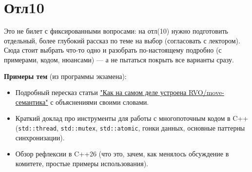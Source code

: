
\section{Отл10}

Это не билет с фиксированными вопросами: на отл(10) нужно подготовить отдельный, более глубокий рассказ по теме на выбор (согласовать с лектором). Сюда стоит выбрать что-то одно и разобрать по-настоящему подробно (с примерами, кодом, нюансами) — а не пытаться покрыть все варианты сразу.

\textbf{Примеры тем} (из программы экзамена):
\begin{itemize}
  \item Подробный пересказ статьи \href{https://habr.com/ru/articles/344206/}{"Как на самом деле устроена RVO/move-семантика"} с объяснениями своими словами.
  \item Краткий доклад про инструменты для работы с многопоточным кодом в C++ (\texttt{std::thread}, \texttt{std::mutex}, \texttt{std::atomic}, гонки данных, основные паттерны синхронизации).
  \item Обзор рефлексии в C++26 (что это, зачем, как менялось обсуждение в комитете, простые примеры использования).
\end{itemize}

